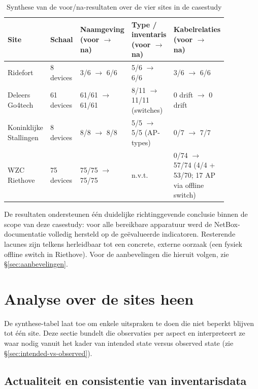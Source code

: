 \begin{table}[H]
  \centering
  \caption[Synthese voor/na over de vier sites]{Synthese van de voor/na-resultaten over de vier sites in de casestudy}
  \label{tab:synthese}
  \footnotesize
  \begin{tabular}{p{0.18\linewidth} p{0.10\linewidth} p{0.18\linewidth} p{0.18\linewidth} p{0.22\linewidth}}
    \toprule
    \textbf{Site} & \textbf{Schaal} & \textbf{Naamgeving (voor $\rightarrow$ na)} & \textbf{Type / inventaris (voor $\rightarrow$ na)} & \textbf{Kabelrelaties (voor $\rightarrow$ na)} \\
    \midrule
    Ridefort & 8 devices & 3/6 $\rightarrow$ 6/6 & 5/6 $\rightarrow$ 6/6 & 3/6 $\rightarrow$ 6/6 \\
    Deleers Go4tech & 61 devices & 61/61 $\rightarrow$ 61/61 & 8/11 $\rightarrow$ 11/11 (switches) & 0 drift $\rightarrow$ 0 drift \\
    Koninklijke Stallingen & 8 devices & 8/8 $\rightarrow$ 8/8 & 5/5 $\rightarrow$ 5/5 (AP-types) & 0/7 $\rightarrow$ 7/7 \\
    WZC Riethove & 75 devices & 75/75 $\rightarrow$ 75/75 & n.v.t. & 0/74 $\rightarrow$ 57/74 (4/4 + 53/70; 17 AP via offline switch) \\
    \bottomrule
  \end{tabular}
\end{table}

De resultaten ondersteunen \'e\'en duidelijke richtinggevende conclusie binnen de scope van deze casestudy: voor alle bereikbare apparatuur werd de NetBox-documentatie volledig hersteld op de geëvalueerde indicatoren. Resterende lacunes zijn telkens herleidbaar tot een concrete, externe oorzaak (een fysiek offline switch in Riethove). Voor de aanbevelingen die hieruit volgen, zie \S\ref{sec:aanbevelingen}.

\section{Analyse over de sites heen}
\label{sec:analyse-cross-site}

De synthese-tabel laat toe om enkele uitspraken te doen die niet beperkt blijven tot \'e\'en site. Deze sectie bundelt die observaties per aspect en interpreteert ze waar nodig vanuit het kader van intended state versus observed state (zie \S\ref{sec:intended-vs-observed}).

\subsection{Actualiteit en consistentie van inventarisdata}
\label{sec:analyse-inventaris}

